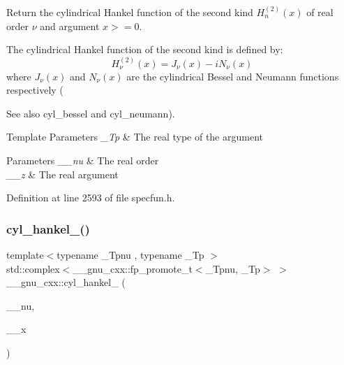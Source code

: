 Return the cylindrical Hankel function of the second kind $ H^{(2)}_n(x) $ of real order $ \nu $ and argument $ x >= 0 $.

The cylindrical Hankel function of the second kind is defined by\+: \[ H^{(2)}_\nu(x) = J_\nu(x) - iN_\nu(x) \] where $ J_\nu(x) $ and $ N_\nu(x) $ are the cylindrical Bessel and Neumann functions respectively (\begin{DoxySeeAlso}{See also}
cyl\+\_\+bessel and cyl\+\_\+neumann).
\end{DoxySeeAlso}

\begin{DoxyTemplParams}{Template Parameters}
{\em \+\_\+\+Tp} & The real type of the argument \\
\hline
\end{DoxyTemplParams}

\begin{DoxyParams}{Parameters}
{\em \+\_\+\+\_\+nu} & The real order \\
\hline
{\em \+\_\+\+\_\+z} & The real argument \\
\hline
\end{DoxyParams}


Definition at line 2593 of file specfun.\+h.

\mbox{\label{group__gnu__math__spec__func_ga326764c0d2dca072c411573503968e50}} 
\subsubsection{\texorpdfstring{cyl\+\_\+hankel\+\_()}{cyl\_hankel\_2()}\hspace{0.1cm}{\footnotesize\ttfamily [2/2]}}
{\footnotesize\ttfamily template$<$typename \+\_\+\+Tpnu , typename \+\_\+\+Tp $>$ \\
std\+::complex$<$\+\_\+\+\_\+gnu\+\_\+cxx\+::fp\+\_\+promote\+\_\+t$<$\+\_\+\+Tpnu, \+\_\+\+Tp$>$ $>$ \+\_\+\+\_\+gnu\+\_\+cxx\+::cyl\+\_\+hankel\+\_ (\begin{DoxyParamCaption}\item[{std\+::complex$<$ \+\_\+\+Tpnu $>$}]{\+\_\+\+\_\+nu,  }\item[{std\+::complex$<$ \+\_\+\+Tp $>$}]{\+\_\+\+\_\+x }\end{DoxyParamCaption})\hspace{0.3cm}{\ttfamily [inline]}}

